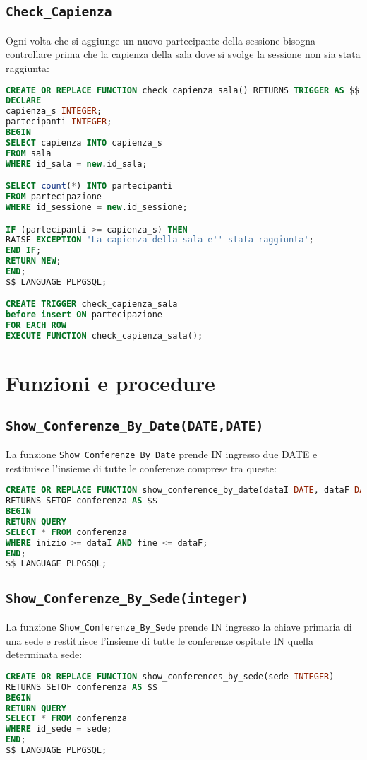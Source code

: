 \subsection{\texttt{Check\_Capienza}}
Ogni volta che si aggiunge un nuovo partecipante della sessione bisogna controllare prima che la capienza della sala dove si svolge la sessione non sia stata raggiunta:
\begin{lstlisting}[language=SQL, style=mystyle]
CREATE OR REPLACE FUNCTION check_capienza_sala() RETURNS TRIGGER AS $$
DECLARE
capienza_s INTEGER;
partecipanti INTEGER;
BEGIN
SELECT capienza INTO capienza_s
FROM sala
WHERE id_sala = new.id_sala;

SELECT count(*) INTO partecipanti
FROM partecipazione
WHERE id_sessione = new.id_sessione;

IF (partecipanti >= capienza_s) THEN
RAISE EXCEPTION 'La capienza della sala e'' stata raggiunta';
END IF;
RETURN NEW;
END;
$$ LANGUAGE PLPGSQL;

CREATE TRIGGER check_capienza_sala
before insert ON partecipazione
FOR EACH ROW
EXECUTE FUNCTION check_capienza_sala();
\end{lstlisting}
\section{Funzioni e procedure}
\subsection{\texttt{Show\_Conferenze\_By\_Date(DATE,DATE)}}
La funzione \texttt{Show\_Conferenze\_By\_Date} prende IN ingresso due DATE e restituisce l'insieme di tutte le conferenze comprese tra queste:
\begin{lstlisting}[language=SQL, style=mystyle]
CREATE OR REPLACE FUNCTION show_conference_by_date(dataI DATE, dataF DATE)
RETURNS SETOF conferenza AS $$
BEGIN
RETURN QUERY
SELECT * FROM conferenza
WHERE inizio >= dataI AND fine <= dataF;
END;
$$ LANGUAGE PLPGSQL;
\end{lstlisting}
\subsection{\texttt{Show\_Conferenze\_By\_Sede(integer)}}
La funzione \texttt{Show\_Conferenze\_By\_Sede} prende IN ingresso la chiave primaria di una sede e restituisce l'insieme di tutte le conferenze ospitate IN quella determinata sede:
\begin{lstlisting}[language=SQL, style=mystyle]
CREATE OR REPLACE FUNCTION show_conferences_by_sede(sede INTEGER)
RETURNS SETOF conferenza AS $$
BEGIN
RETURN QUERY
SELECT * FROM conferenza
WHERE id_sede = sede;
END;
$$ LANGUAGE PLPGSQL;
\end{lstlisting}
